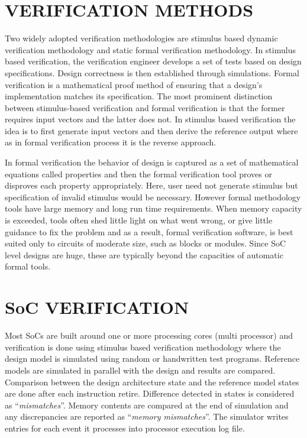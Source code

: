 \section{VERIFICATION METHODS}
Two widely adopted verification methodologies are stimulus based dynamic verification methodology and static formal verification methodology. In stimulus based verification, the verification engineer develops a set of tests based on design specifications. Design correctness is then established through simulations. Formal verification is a mathematical proof method of ensuring that a design's implementation matches its specification. The most prominent distinction between stimulus-based verification and formal verification is that the former requires input vectors and the latter does not. In stimulus based verification the idea is to first generate input vectors and then derive the reference output where as in formal verification process it is the reverse approach.

In formal verification the behavior of design is captured as a set of mathematical equations called properties and then the formal verification tool proves or disproves each property appropriately. Here, user need not generate stimulus but specification of invalid stimulus would be necessary. However formal methodology tools have large memory and long run time requirements. When memory capacity is exceeded, tools often shed little light on what went wrong, or give little guidance to fix the problem and as a result, formal verification software, is best suited only to circuits of moderate size, such as blocks or modules. Since SoC level designs are huge, these are typically beyond the capacities of automatic formal tools\cite{ieee:formal:2004}. 

\section{SoC VERIFICATION}
Most SoCs are built around one or more processing cores (multi processor) and verification is done using stimulus based verification methodology where the design model is simulated using random or handwritten test programs. Reference models are simulated in parallel with the design and results are compared.  Comparison between the design architecture state and the reference model states are done after each instruction retire. Difference detected in states is considered as ``{\it mismatches}''. Memory contents are compared at the end of simulation and any discrepancies are reported as ``{\it memory mismatches}''.  The simulator writes entries for each event it processes into processor execution log file.

